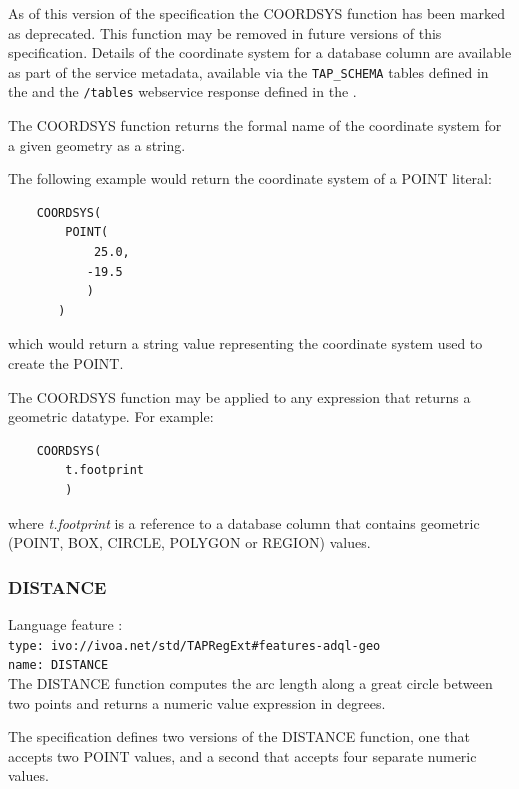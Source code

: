 \documentclass[11pt,a4paper]{ivoa}
\begin{document}
As of this version of the specification the COORDSYS function has
been marked as deprecated. This function may be removed in future versions
of this specification.
Details of the coordinate system for a database column are available as part of
the service metadata, available via the \verb:TAP_SCHEMA: tables defined in the
\TAPSpec and the \verb:/tables: webservice response defined in the \VOSISpec.


The COORDSYS function returns the formal name of the coordinate system for
a given geometry as a string.

The following example would return the coordinate system of a POINT literal:
\begin{verbatim}
    COORDSYS(
        POINT(
            25.0,
           -19.5
           )
       )
\end{verbatim}
\noindent
which would return a string value representing the coordinate system used
to create the POINT.

The COORDSYS function may be applied to any expression that returns a
geometric datatype. For example:
\begin{verbatim}
    COORDSYS(
        t.footprint
        )
\end{verbatim}
\noindent
where \textit{t.footprint} is a reference to a database column that
contains geometric (POINT, BOX, CIRCLE, POLYGON or REGION) values.

\subsubsection{DISTANCE}
\label{sec:functions.geom.distance}
{\footnotesize Language feature :}\\
{\footnotesize \verb|type: ivo://ivoa.net/std/TAPRegExt#features-adql-geo|}\\
{\footnotesize \verb|name: DISTANCE|}\\

The DISTANCE function computes the arc length along a great circle between two
points and returns a numeric value expression in degrees.

The specification defines two versions of the DISTANCE function, one that
accepts two POINT values, and a second that accepts four separate numeric
values.
\end{document}
